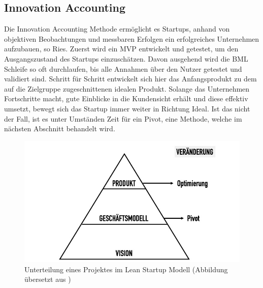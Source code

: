 \subsection*{\label{sec:LeanStartup-InnovationAccounting}\thesubsection\quad Innovation Accounting}
Die Innovation Accounting Methode ermöglicht es Startups, anhand von objektiven Beobachtungen und messbaren Erfolgen ein erfolgreiches Unternehmen aufzubauen, so Ries. Zuerst wird ein \ac{MVP} entwickelt und getestet, um den Ausgangszustand des Startups einzuschätzen. Davon ausgehend wird die \ac{BML} Schleife so oft durchlaufen, bis alle Annahmen über den Nutzer getestet und validiert sind. Schritt für Schritt entwickelt sich hier das Anfangsprodukt zu dem auf die Zielgruppe zugeschnittenen idealen Produkt. Solange das Unternehmen Fortschritte macht, gute Einblicke in die Kundensicht erhält und diese effektiv umsetzt, bewegt sich das Startup immer weiter in Richtung Ideal. Ist das nicht der Fall, ist es unter Umständen Zeit für ein Pivot, eine Methode, welche im nächsten Abschnitt behandelt wird.

\begin{figure}[h!]
	\begin{center}
		\includegraphics[scale=0.5]{99_IMG/02_Grundlagen/visionStrategyProduct.jpg}
		\caption[Unterteilung eines Projektes im Lean Startup Modell]{Unterteilung eines Projektes im Lean Startup Modell (Abbildung übersetzt aus )}
		\label{fig:LeanStartup_VisionStrategyProduct}
	\end{center}
\end{figure}

